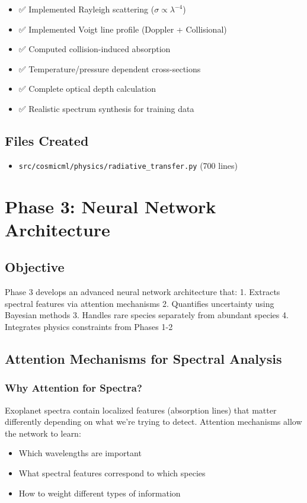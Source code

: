 \documentclass[12pt,a4paper,oneside]{report}
\begin{document}
\begin{itemize}
    \item ✅ Implemented Rayleigh scattering ($\sigma \propto \lambda^{-4}$)
    \item ✅ Implemented Voigt line profile (Doppler + Collisional)
    \item ✅ Computed collision-induced absorption
    \item ✅ Temperature/pressure dependent cross-sections
    \item ✅ Complete optical depth calculation
    \item ✅ Realistic spectrum synthesis for training data
\end{itemize}

\section{Files Created}

\begin{itemize}
    \item \texttt{src/cosmicml/physics/radiative\_transfer.py} (700 lines)
\end{itemize}

\newpage
\chapter{Phase 3: Neural Network Architecture}

\section{Objective}

Phase 3 develops an advanced neural network architecture that:
1. Extracts spectral features via attention mechanisms
2. Quantifies uncertainty using Bayesian methods
3. Handles rare species separately from abundant species
4. Integrates physics constraints from Phases 1-2

\section{Attention Mechanisms for Spectral Analysis}

\subsection{Why Attention for Spectra?}

Exoplanet spectra contain localized features (absorption lines) that matter differently depending on what we're trying to detect. Attention mechanisms allow the network to learn:
\begin{itemize}
    \item Which wavelengths are important
    \item What spectral features correspond to which species
    \item How to weight different types of information
\end{itemize}
\end{document}
